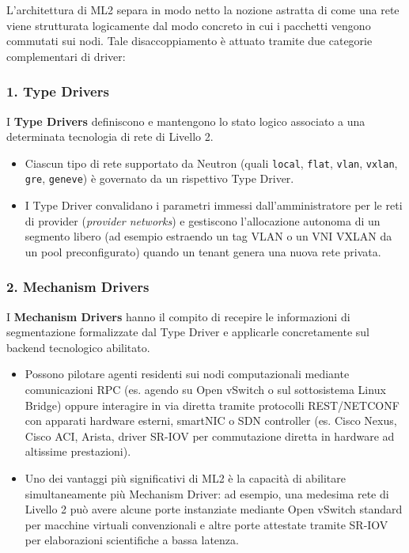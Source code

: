 \documentclass[11pt, a4paper]{article}
\begin{document}
L'architettura di ML2 separa in modo netto la nozione astratta di come una rete viene strutturata logicamente dal modo concreto in cui i pacchetti vengono commutati sui nodi. Tale disaccoppiamento è attuato tramite due categorie complementari di driver:

\subsubsection{1. Type Drivers}

I \textbf{Type Drivers} definiscono e mantengono lo stato logico associato a una determinata tecnologia di rete di Livello 2.
\begin{itemize}
    \item Ciascun tipo di rete supportato da Neutron (quali \texttt{local}, \texttt{flat}, \texttt{vlan}, \texttt{vxlan}, \texttt{gre}, \texttt{geneve}) è governato da un rispettivo Type Driver.
    \item I Type Driver convalidano i parametri immessi dall'amministratore per le reti di provider (\emph{provider networks}) e gestiscono l'allocazione autonoma di un segmento libero (ad esempio estraendo un tag VLAN o un VNI VXLAN da un pool preconfigurato) quando un tenant genera una nuova rete privata.
\end{itemize}

\subsubsection{2. Mechanism Drivers}

I \textbf{Mechanism Drivers} hanno il compito di recepire le informazioni di segmentazione formalizzate dal Type Driver e applicarle concretamente sul backend tecnologico abilitato.
\begin{itemize}
    \item Possono pilotare agenti residenti sui nodi computazionali mediante comunicazioni RPC (es. agendo su Open vSwitch o sul sottosistema Linux Bridge) oppure interagire in via diretta tramite protocolli REST/NETCONF con apparati hardware esterni, smartNIC o SDN controller (es. Cisco Nexus, Cisco ACI, Arista, driver SR-IOV per commutazione diretta in hardware ad altissime prestazioni).
    \item Uno dei vantaggi più significativi di ML2 è la capacità di abilitare simultaneamente più Mechanism Driver: ad esempio, una medesima rete di Livello 2 può avere alcune porte instanziate mediante Open vSwitch standard per macchine virtuali convenzionali e altre porte attestate tramite SR-IOV per elaborazioni scientifiche a bassa latenza.
\end{itemize}
\end{document}
